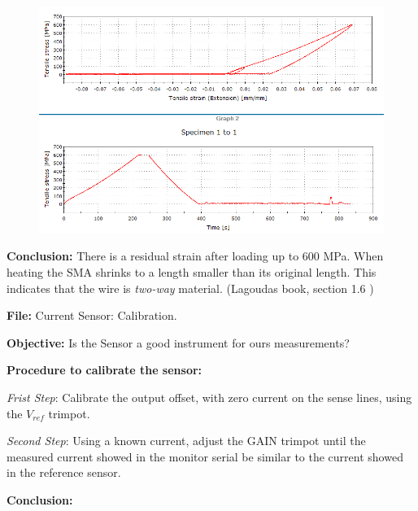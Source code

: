 \documentclass[idxtotoc,hyperref,openany]{labbook} %
\begin{document}
\begin{figure}[ht]
\centering
\includegraphics[width=\linewidth]{DYN1_hybrid_SME.png}
\end{figure}

\textbf{Conclusion:} There is a residual strain after loading up to 600 MPa. When heating the SMA shrinks to a length smaller than its original length. This indicates that the wire is \emph{two-way} material. (Lagoudas book, section 1.6 \cite{lagoudas_shape_2008})



\textbf{File:} Current Sensor: Calibration.

\textbf{Objective:} Is the Sensor a good instrument for ours measurements?

\textbf{Procedure to calibrate the sensor:}


\hspace{2cm} 
\textit{Frist Step}: Calibrate the output offset, with zero current on the sense lines, using the $V_{ref}$ trimpot.

\hspace{2cm} 
\textit{Second Step}: Using a known current, adjust the GAIN trimpot until the measured current showed in the monitor serial be similar to the current showed in the reference sensor.

\textbf{Conclusion:} 
\end{document}
